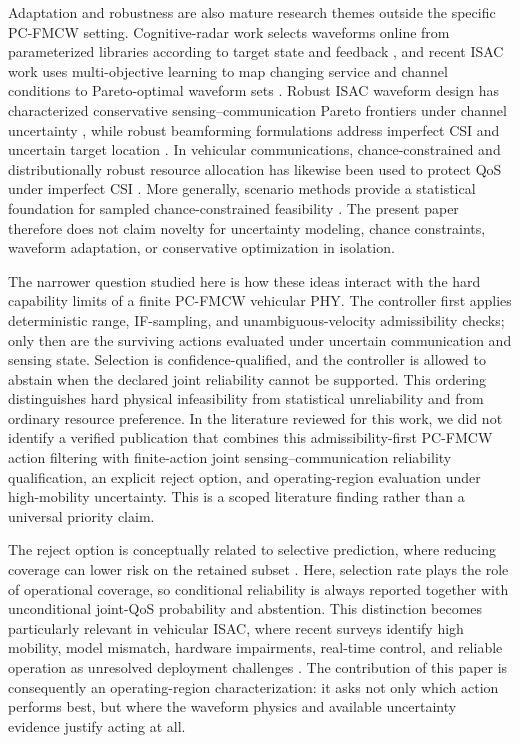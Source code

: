 \documentclass[journal]{IEEEtran}
\begin{document}
Adaptation and robustness are also mature research themes outside the specific PC-FMCW setting. Cognitive-radar work selects waveforms online from parameterized libraries according to target state and feedback \cite{tholeti2024online}, and recent ISAC work uses multi-objective learning to map changing service and channel conditions to Pareto-optimal waveform sets \cite{yazar2026adaptive}. Robust ISAC waveform design has characterized conservative sensing--communication Pareto frontiers under channel uncertainty \cite{wang2024robustwaveform}, while robust beamforming formulations address imperfect CSI and uncertain target location \cite{lyu2024dualrobust,xu2024robustisac}. In vehicular communications, chance-constrained and distributionally robust resource allocation has likewise been used to protect QoS under imperfect CSI \cite{wu2021robustv2x}. More generally, scenario methods provide a statistical foundation for sampled chance-constrained feasibility \cite{campi2011sampling,care2014fast}. The present paper therefore does not claim novelty for uncertainty modeling, chance constraints, waveform adaptation, or conservative optimization in isolation.

The narrower question studied here is how these ideas interact with the hard capability limits of a finite PC-FMCW vehicular PHY. The controller first applies deterministic range, IF-sampling, and unambiguous-velocity admissibility checks; only then are the surviving actions evaluated under uncertain communication and sensing state. Selection is confidence-qualified, and the controller is allowed to abstain when the declared joint reliability cannot be supported. This ordering distinguishes hard physical infeasibility from statistical unreliability and from ordinary resource preference. In the literature reviewed for this work, we did not identify a verified publication that combines this admissibility-first PC-FMCW action filtering with finite-action joint sensing--communication reliability qualification, an explicit reject option, and operating-region evaluation under high-mobility uncertainty. This is a scoped literature finding rather than a universal priority claim.

The reject option is conceptually related to selective prediction, where reducing coverage can lower risk on the retained subset \cite{geifman2019selectivenet}. Here, selection rate plays the role of operational coverage, so conditional reliability is always reported together with unconditional joint-QoS probability and abstention. This distinction becomes particularly relevant in vehicular ISAC, where recent surveys identify high mobility, model mismatch, hardware impairments, real-time control, and reliable operation as unresolved deployment challenges \cite{ma2026vehicularisac}. The contribution of this paper is consequently an operating-region characterization: it asks not only which action performs best, but where the waveform physics and available uncertainty evidence justify acting at all.
\end{document}
